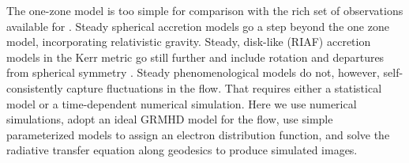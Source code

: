 
The one-zone model is too simple for comparison with the rich set of observations available for \sgra.  Steady spherical accretion models \citep[e.g.,][]{2019ApJ...885L..33N, 2021arXiv211102178B} go a step beyond the one zone model, incorporating relativistic gravity.  Steady, disk-like (RIAF) accretion models in the Kerr metric go still further and include rotation and departures from spherical symmetry \citep[e.g.,][]{2009ApJ...697...45B, 2009ApJ...706..960H,2018ApJ...863..148P}.
Steady phenomenological models do not, however, self-consistently capture fluctuations in the flow.  That requires either a statistical model \citep{2021ApJ...906...39L} or a time-dependent numerical simulation.
Here we use numerical simulations, adopt an ideal GRMHD model for the flow, use simple parameterized models to assign an electron distribution function, and solve the radiative transfer equation along geodesics to produce simulated images.

